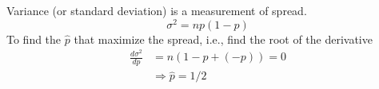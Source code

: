 \documentclass[slidestop,compress,mathserif]{beamer}
\begin{document}

\begin{frame}\frametitle{}


\pause\vspace{0.5cm}
Variance (or standard deviation) is a measurement of spread.
\[ \sigma^2 = np(1-p) \]
\pause
To find the $\hat{p}$ that maximize the spread, i.e., find the root of the derivative
\begin{align*}
\frac{d \sigma^2}{d p} & = n (1-p + (-p)) = 0\\
& \Longrightarrow \hat{p} = 1/2
\end{align*}



\end{frame}


%
\end{document}
